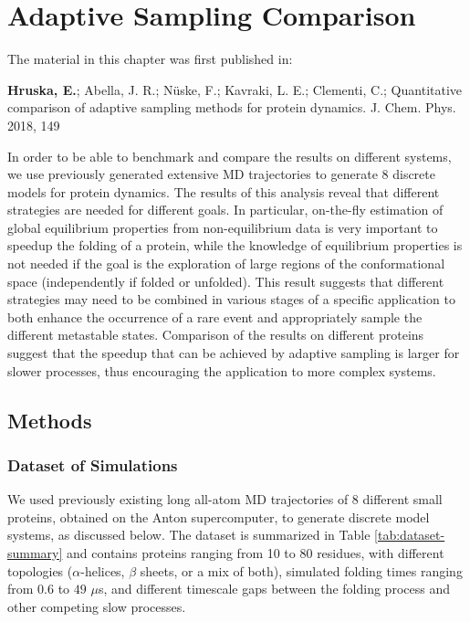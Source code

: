 \afterpage{\null\newpage}
\chapter{Adaptive Sampling Comparison\label{ch:chapter32}}

The material in this chapter was first published in: 

\cite{Adstrategies2018} \textbf{Hruska, E.}; Abella, J. R.; N\"uske, F.;
Kavraki, L. E.; Clementi, C.; Quantitative
comparison of adaptive sampling methods
for protein dynamics. J. Chem. Phys.
2018, 149 


In order to be able to benchmark and compare the results on different systems, we
use previously generated extensive MD trajectories \cite{lindorff2011} to
generate 8 discrete models for protein dynamics.
The results of this analysis reveal that different strategies are needed
for different goals. In particular, on-the-fly estimation of global
equilibrium properties from non-equilibrium data is very important to speedup
the folding of a protein, while the knowledge of equilibrium properties is not
needed if the goal is the exploration of large regions of the conformational
space (independently if folded or unfolded). This result suggests that
different strategies may need to
be combined in various stages of a specific application to both enhance the
occurrence of a rare event and appropriately sample the different metastable states.
Comparison of the results on different proteins
suggest that the speedup that can be achieved by adaptive sampling is larger
for slower processes, thus encouraging the application to more complex systems.



\section{\label{sec:methods}Methods}


\subsection{\label{sec:methods-dataset}Dataset of Simulations}

We used previously existing long all-atom MD trajectories
of 8 different small proteins\cite{lindorff2011}, obtained on the Anton supercomputer, to generate
discrete model systems, as discussed below. The dataset is summarized in Table
\ref{tab:dataset-summary} and contains proteins ranging from 10 to 80 residues,
with different topologies ($\alpha$-helices, $\beta$ sheets, or a mix of both),
simulated folding times ranging from $0.6$ to $49$ $\mu$s, and different timescale gaps between
the folding process and other competing slow processes.

